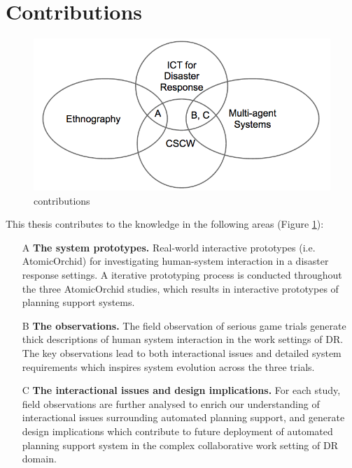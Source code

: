 \section{Contributions} 
\begin{figure}[h]
  \centering
  \includegraphics[scale=0.5]{img/introduction/contributions.png}
  \caption{contributions}
  \label{fig:contributions}
\end{figure}


This thesis contributes to the knowledge in the following areas (Figure \ref{fig:contributions}): \\

\begin{enumerate}
  \item[A] \textbf{The system prototypes.} Real-world interactive prototypes (i.e. AtomicOrchid) for investigating human-system interaction in a disaster response settings. A iterative prototyping process is conducted throughout the three AtomicOrchid studies, which results in interactive prototypes of planning support systems. 
  
  \item[B] \textbf{The observations.} The field observation of serious game trials generate thick descriptions of human system interaction in the work settings of \ac{DR}. The key observations lead to both interactional issues and detailed system requirements which inspires system evolution across the three trials.
  
  \item[C] \textbf{The interactional issues and design implications.} For each study, field observations are further analysed to enrich our understanding of interactional issues surrounding automated planning support, and generate design implications which contribute to future deployment of automated planning support system in the complex collaborative work setting of \ac{DR} domain. 
\end{enumerate}


